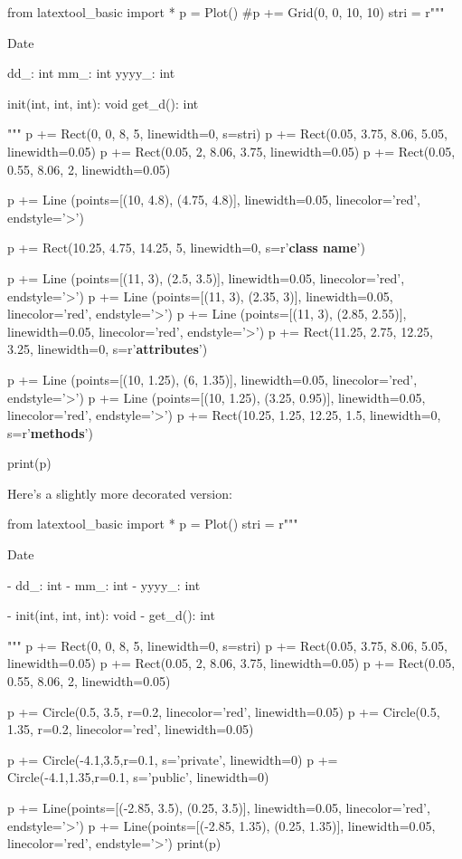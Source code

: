 \begin{python}
from latextool_basic import *
p = Plot()
#p += Grid(0, 0, 10, 10)
stri = r"""
\begin{consolethree}[escapeinside=||]
                Date


  dd_: int
  mm_: int
  yyyy_: int


  init(int, int, int): void
  get_d(): int
  
\end{consolethree}
"""
p += Rect(0, 0, 8, 5, linewidth=0, s=stri)
p += Rect(0.05, 3.75, 8.06, 5.05, linewidth=0.05)
p += Rect(0.05, 2, 8.06, 3.75, linewidth=0.05)
p += Rect(0.05, 0.55, 8.06, 2, linewidth=0.05)

p += Line (points=[(10, 4.8), (4.75, 4.8)], linewidth=0.05, linecolor='red', endstyle='>')

p += Rect(10.25, 4.75, 14.25, 5, linewidth=0, s=r'\textbf{class name}')

p += Line (points=[(11, 3), (2.5, 3.5)], linewidth=0.05, linecolor='red', endstyle='>')
p += Line (points=[(11, 3), (2.35, 3)], linewidth=0.05, linecolor='red', endstyle='>')
p += Line (points=[(11, 3), (2.85, 2.55)], linewidth=0.05, linecolor='red', endstyle='>')
p += Rect(11.25, 2.75, 12.25, 3.25, linewidth=0, s=r'\textbf{attributes}')

p += Line (points=[(10, 1.25), (6, 1.35)], linewidth=0.05, linecolor='red', endstyle='>')
p += Line (points=[(10, 1.25), (3.25, 0.95)], linewidth=0.05, linecolor='red', endstyle='>')
p += Rect(10.25, 1.25, 12.25, 1.5, linewidth=0, s=r'\textbf{methods}')

print(p)
\end{python}
Here's a slightly more decorated version:

\begin{python}
from latextool_basic import *
p = Plot()
stri = r"""
\begin{consolethree}[escapeinside=||]
                Date


 - dd_: int
 - mm_: int
 - yyyy_: int


 - init(int, int, int): void
 - get_d(): int
  
\end{consolethree}
"""
p += Rect(0, 0, 8, 5, linewidth=0, s=stri)
p += Rect(0.05, 3.75, 8.06, 5.05, linewidth=0.05)
p += Rect(0.05, 2, 8.06, 3.75, linewidth=0.05)
p += Rect(0.05, 0.55, 8.06, 2, linewidth=0.05)

p += Circle(0.5, 3.5, r=0.2, linecolor='red', linewidth=0.05)
p += Circle(0.5, 1.35, r=0.2, linecolor='red', linewidth=0.05)

p += Circle(-4.1,3.5,r=0.1, s='private', linewidth=0)
p += Circle(-4.1,1.35,r=0.1, s='public', linewidth=0)

p += Line(points=[(-2.85, 3.5), (0.25, 3.5)], linewidth=0.05, linecolor='red', endstyle='>')
p += Line(points=[(-2.85, 1.35), (0.25, 1.35)], linewidth=0.05, linecolor='red', endstyle='>')
print(p)
\end{python}
